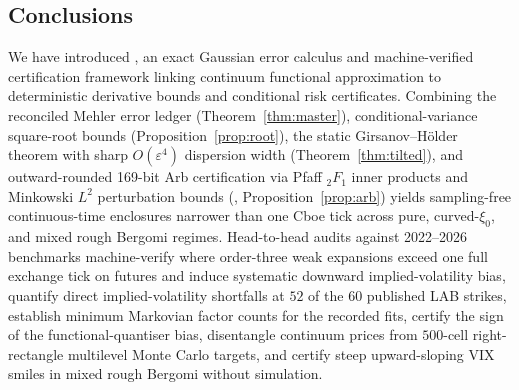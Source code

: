 \subsection{Conclusions}
We have introduced \RoughCert{}, an exact Gaussian error calculus and machine-verified certification
framework linking continuum functional approximation to deterministic derivative bounds and conditional risk
certificates. Combining the reconciled Mehler error ledger (Theorem~\ref{thm:master}), conditional-variance
square-root bounds (Proposition~\ref{prop:root}), the static \RoughCertTilt{} Girsanov--H\"older theorem with
sharp $O(\varepsilon^4)$ dispersion width (Theorem~\ref{thm:tilted}), and outward-rounded 169-bit Arb
certification via Pfaff ${}_2F_1$ inner products and Minkowski $L^2$ perturbation bounds
(\RoughCertCV{}, Proposition~\ref{prop:arb}) yields sampling-free continuous-time enclosures narrower than
one Cboe tick across pure, curved-$\xi_0$, and mixed rough Bergomi regimes. Head-to-head audits against
2022--2026 benchmarks machine-verify where order-three weak expansions exceed one full exchange tick on
futures and induce systematic downward implied-volatility bias, quantify direct implied-volatility shortfalls at $52$ of the $60$
published LAB strikes, establish minimum Markovian factor counts for the recorded fits, certify the sign of
the functional-quantiser bias, disentangle
continuum prices from $500$-cell right-rectangle multilevel Monte Carlo targets, and certify steep
upward-sloping VIX smiles in mixed rough Bergomi without simulation.
